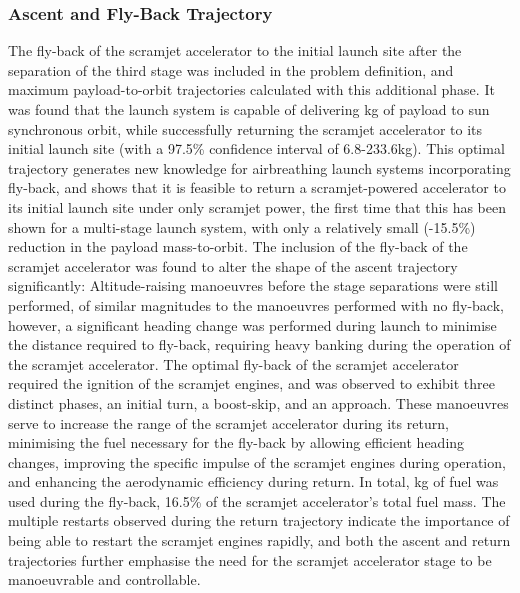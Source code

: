 \subsubsection{Ascent and Fly-Back Trajectory}
The fly-back of the scramjet accelerator to the initial launch site after the separation of the third stage was included in the problem definition, and maximum payload-to-orbit trajectories calculated with this additional phase. 
It was found that the launch system is capable of delivering \PayloadToOrbitStandard kg of payload to sun synchronous orbit, while successfully returning the scramjet accelerator to its initial launch site (with a 97.5\% confidence interval of 6.8-233.6kg). This optimal trajectory generates new knowledge for airbreathing launch systems incorporating fly-back, and shows that it is feasible to return a scramjet-powered accelerator to its initial launch site under only scramjet power, the first time that this has been shown for a multi-stage launch system, with only a relatively small (-15.5\%) reduction in the payload mass-to-orbit.
	The inclusion of the fly-back of the scramjet accelerator was found to alter the shape of the ascent trajectory significantly: Altitude-raising manoeuvres before the stage separations were still performed, of similar magnitudes to the manoeuvres performed with no fly-back, however, a significant heading change was performed during launch to minimise the distance required to fly-back, requiring heavy banking during the operation of the scramjet accelerator. 
The optimal fly-back of the scramjet accelerator required the ignition of the scramjet engines, and was observed to exhibit three distinct phases, an initial turn, a boost-skip, and an approach. 
These manoeuvres serve to increase the range of the scramjet accelerator during its return, minimising the fuel necessary for the fly-back by allowing efficient heading changes, improving the specific impulse of the scramjet engines during operation, and enhancing the aerodynamic efficiency during return.
 In total, \returnFuelStandard kg of fuel was used during the fly-back, 16.5\% of the scramjet accelerator's total fuel mass. The multiple restarts observed during the return trajectory indicate the importance of being able to restart the scramjet engines rapidly, and both the ascent and return trajectories further emphasise the need for the scramjet accelerator stage to be manoeuvrable and controllable. 
 
